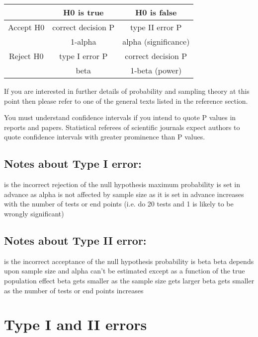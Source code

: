 \documentclass[]{report}
\begin{document}
\begin{center}
\begin{tabular}{|c|c|c|} \hline
& H0 is true &  H0 is false \\ \hline 
Accept H0& correct decision P & type II error P \\ 
& 1-alpha& alpha (significance)\\\hline 
Reject H0& type I error P & correct decision P \\
&beta&1-beta (power)\\ \hline
\end{tabular} 
\end{center}





If you are interested in further details of probability and sampling theory at this point then please refer to one of the general texts listed in the reference section.

You must understand confidence intervals if you intend to quote P values in reports and papers. Statistical referees of scientific journals expect authors to quote confidence intervals with greater prominence than P values.

\subsection{Notes about Type I error:}
is the incorrect rejection of the null hypothesis
maximum probability is set in advance as alpha
is not affected by sample size as it is set in advance
increases with the number of tests or end points (i.e. do 20 tests and 1 is likely to be wrongly significant)

\subsection{Notes about Type II error:}
is the incorrect acceptance of the null hypothesis
probability is beta
beta depends upon sample size and alpha
can't be estimated except as a function of the true population effect
beta gets smaller as the sample size gets larger
beta gets smaller as the number of tests or end points increases


\section{Type I and II errors}
\end{document}
